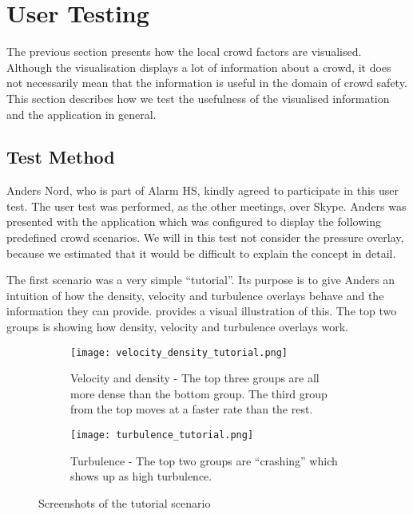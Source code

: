 \section{User Testing} \label{sec:s4_test}

The previous section presents how the local crowd factors are visualised. Although the visualisation displays a lot of information about a crowd, it does not necessarily mean that the information is useful in the domain of crowd safety. This section describes how we test the usefulness of the visualised information and the application in general.

\subsection{Test Method}
Anders Nord, who is part of Alarm HS, kindly agreed to participate in this user test. The user test was performed, as the other meetings, over Skype. Anders was presented with the application which was configured to display the following predefined crowd scenarios. We will in this test not consider the pressure overlay, because we estimated that it would be difficult to explain the concept in detail.  

The first scenario was a very simple \enquote{tutorial}. Its purpose is to give Anders an intuition of how the density, velocity and turbulence overlays behave and the information they can provide.  provides a visual illustration of this. The top two groups is showing how density, velocity and turbulence overlays work.

\begin{figure}[htbp]
\begin{subfigure}[t]{.49\linewidth}
    \centering
    \texttt{[image: velocity\_density\_tutorial.png]}
    \caption{Velocity and density - The top three groups are all more dense than the bottom group. The third group from the top moves at a faster rate than the rest.}
\end{subfigure}
\enspace
\begin{subfigure}[t]{.49\linewidth}
    \centering
    \texttt{[image: turbulence\_tutorial.png]}
    \caption{Turbulence - The top two groups are \enquote{crashing} which shows up as high turbulence.}
\end{subfigure}
\caption{Screenshots of the tutorial scenario}
\label{fig:tutorial_screens}
\end{figure}

